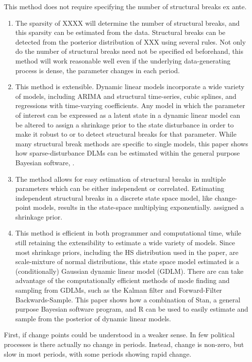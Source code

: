 This method does not require specifying the number of structural breaks ex ante.
\begin{enumerate}
\item The sparsity of XXXX will determine the number of structural breaks, and this sparsity can be estimated from the data.
Structural breaks can be detected from the posterior distribution of XXX using several rules. Not only do
the number of structural breaks need not be specifieded beforehand, this method will work reasonable
well even if the underlying data-generating process is dense, \ie{}the parameter changes in each period.
\item This method is extensible. 
  Dynamic linear models incorporate a wide variety of models, including ARIMA
  and structural time-series, cubic splines, and regressions with time-varying coefficients. Any model in
  which the parameter of interest can be expressed as a latent state in a dynamic linear model can be
  altered to assign a shrinkage prior to the state disturbance in order to make it robust to or to detect
  structural breaks for that parameter. While many structural break methods are specific to single
  models, this paper shows how sparse-disturbance DLMs can be estimated within the general purpose
  Bayesian software, \Stan{}.
\item The method allows for easy estimation of structural breaks in multiple parameters which can be either
independent or correlated. Estimating independent structural breaks in a discrete state space model,
like change-point models, results in the state-space multiplying exponentially.
assigned a shrinkage prior.
\item This method is efficient in both programmer and computational time, while still retaining the extensibility
to estimate a wide variety of models. Since most shrinkage priors, including the HS distribution
used in the paper, are scale-mixture of normal distributions, this state space model estimated is a
(conditionally) Gaussian dynamic linear model (GDLM). There are can take advantage of the computationally
efficient methods of mode finding and sampling from GDLMs, such as the Kalman filter and
Forward-Filter Backwards-Sample. This paper shows how a combination of Stan, a general purpose
Bayesian software program, and R can be used to easily estimate and sample from the posterior of
dynamic linear models.
\end{enumerate}

First, if change points could be understood in a weaker sense. 
In few political processes is there actually no change in periods.
Instead, change is non-zero, but slow in most periods, with some periods showing rapid change.

